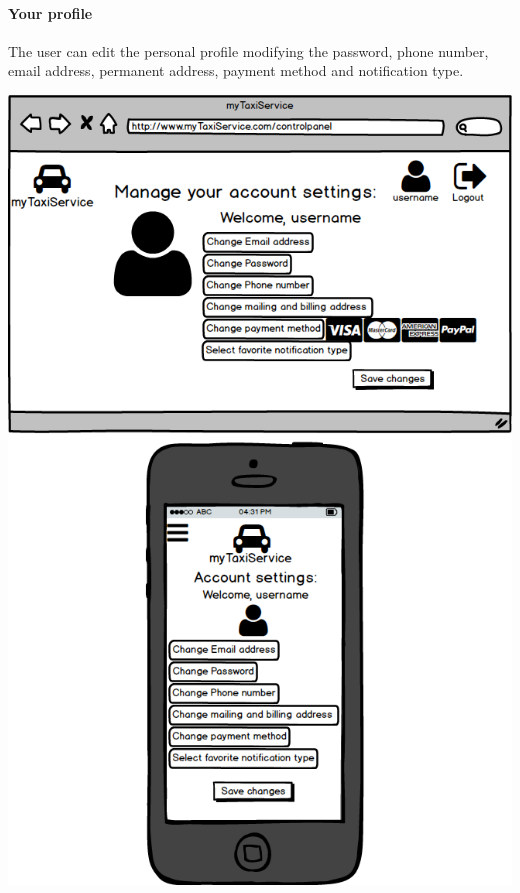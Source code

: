 \documentclass[a4paper,11pt]{report} %
\begin{document}
	\paragraph{Your profile} The user can edit the personal profile modifying the password, phone number, email address, permanent address, payment method and notification type.
	\begin{center}
		\includegraphics[width=0.9\linewidth]{Pictures/AccountPage}
	\end{center}
	\pagebreak
	
\end{document}
